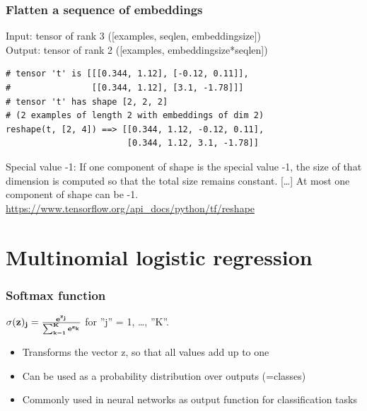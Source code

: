 \documentclass{beamer}
\begin{document}
\begin{frame}[fragile]
  \frametitle{Flatten a sequence of embeddings}


  Input: tensor of rank 3 ([examples, seq\textunderscore len, embedding\textunderscore size])\\
  Output: tensor of rank 2 ([examples, embedding\textunderscore size*seq\textunderscore len])
  
 
  \begin{footnotesize}
\begin{lstlisting}
# tensor 't' is [[[0.344, 1.12], [-0.12, 0.11]],
#                [[0.344, 1.12], [3.1, -1.78]]]
# tensor 't' has shape [2, 2, 2]
# (2 examples of length 2 with embeddings of dim 2)
reshape(t, [2, 4]) ==> [[0.344, 1.12, -0.12, 0.11],
                        [0.344, 1.12, 3.1, -1.78]]
\end{lstlisting}
  \end{footnotesize}

  \vspace{1ex} \pause
  Special value -1:
  If one component of shape is the special value -1, the size of that dimension
  is computed so that the total size remains constant. [\ldots] At most one component of shape can be -1.
  {\tiny\url{https://www.tensorflow.org/api_docs/python/tf/reshape}}
  
\end{frame}

\section{Multinomial logistic regression}

\begin{frame}
  \frametitle{Softmax function}
$\sigma(\bf{z})_j = \frac{e^{z_j}}{\sum_{k=1}^K e^{z_k}}$ for ''j'' = 1, …, ''K''.

  \begin{itemize}
 	 \item Transforms the vector z, so that all values add up to one
 	 \item Can be used as a probability distribution over outputs (=classes)
 	 \item Commonly used in neural networks as output function for classification tasks
  \end{itemize}
\end{frame}
\end{document}
